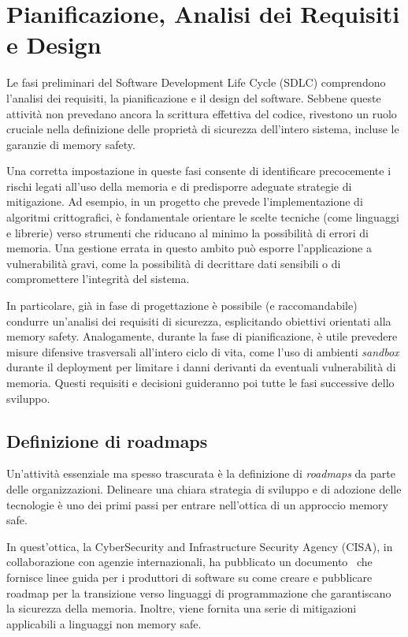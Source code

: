 \section{Pianificazione, Analisi dei Requisiti e Design}
\label{sec:planning_requirements_design}

Le fasi preliminari del Software Development Life Cycle (SDLC) comprendono l'analisi
dei requisiti, la pianificazione e il design del software. Sebbene queste attività
non prevedano ancora la scrittura effettiva del codice, rivestono un ruolo
cruciale nella definizione delle proprietà di sicurezza dell'intero sistema, incluse
le garanzie di memory safety.

Una corretta impostazione in queste fasi consente di identificare precocemente i
rischi legati all'uso della memoria e di predisporre adeguate strategie di mitigazione.
Ad esempio, in un progetto che prevede l'implementazione di algoritmi crittografici,
è fondamentale orientare le scelte tecniche (come linguaggi e librerie) verso
strumenti che riducano al minimo la possibilità di errori di memoria. Una gestione
errata in questo ambito può esporre l'applicazione a vulnerabilità gravi, come
la possibilità di decrittare dati sensibili o di compromettere l'integrità del
sistema.

In particolare, già in fase di progettazione è possibile (e raccomandabile) condurre
un'analisi dei requisiti di sicurezza, esplicitando obiettivi orientati alla
memory safety. Analogamente, durante la fase di pianificazione, è utile prevedere
misure difensive trasversali all'intero ciclo di vita, come l'uso di ambienti
\textit{sandbox} durante il deployment per limitare i danni derivanti da eventuali
vulnerabilità di memoria. Questi requisiti e decisioni guideranno poi tutte le
fasi successive dello sviluppo.

\subsection{Definizione di roadmaps}
\label{sec:roadmap} Un'attività essenziale ma spesso trascurata è la definizione
di \textit{roadmaps} da parte delle organizzazioni. Delineare una chiara
strategia di sviluppo e di adozione delle tecnologie è uno dei primi passi per
entrare nell'ottica di un approccio memory safe.

In quest'ottica, la CyberSecurity and Infrastructure Security Agency (CISA), in
collaborazione con agenzie internazionali, ha pubblicato un documento~\cite{memory_safe_roadmaps}
che fornisce linee guida per i produttori di software su come creare e pubblicare
roadmap per la transizione verso linguaggi di programmazione che garantiscano la
sicurezza della memoria. Inoltre, viene fornita una serie di mitigazioni applicabili
a linguaggi non memory safe.

